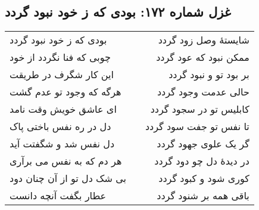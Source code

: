 \begin{center}
\section*{غزل شماره ۱۷۲: بودی که ز خود نبود گردد}
\label{sec:172}
\begin{longtable}{l p{0.5cm} r}
بودی که ز خود نبود گردد
&&
شایستهٔ وصل زود گردد
\\
چوبی که فنا نگردد از خود
&&
ممکن نبود که عود گردد
\\
این کار شگرف در طریقت
&&
بر بود تو و نبود گردد
\\
هرگه که وجود تو عدم گشت
&&
حالی عدمت وجود گردد
\\
ای عاشق خویش وقت نامد
&&
کابلیس تو در سجود گردد
\\
دل در ره نفس باختی پاک
&&
تا نفس تو جفت سود گردد
\\
دل نفس شد و شگفتت آید
&&
گر یک علوی جهود گردد
\\
هر دم که به نفس می برآری
&&
در دیدهٔ دل چو دود گردد
\\
بی شک دل تو از آن چنان دود
&&
کوری شود و کبود گردد
\\
عطار بگفت آنچه دانست
&&
باقی همه بر شنود گردد
\\
\end{longtable}
\end{center}
